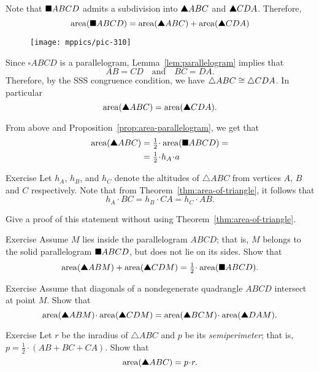 {Note that $\blacksquare ABCD$ admits a subdivision into $\solidtriangle ABC$ and $\solidtriangle CDA$.
Therefore, 
\[\area(\solidsquare ABCD)
=
\area(\solidtriangle ABC)
+
\area(\solidtriangle CDA)\]

\begin{wrapfigure}{o}{28 mm}
\centering
\texttt{[image: mppics/pic-310]}
\end{wrapfigure}

Since $\square ABCD$ is a parallelogram,  Lemma~\ref{lem:parallelogram} implies that
\[AB=CD
\quad
\text{and}
\quad
BC=DA.\]
Therefore, by the SSS congruence condition, we have
$\triangle ABC\z\cong\triangle CDA$.
In particular
\[\area(\solidtriangle ABC)
=
\area(\solidtriangle CDA).\]

From above and Proposition~\ref{prop:area-parallelogram}, we get that
\begin{align*}
\area(\solidtriangle ABC)
&=\tfrac12\cdot\area(\solidsquare ABCD)=
\\
&=\tfrac12\cdot h_A\cdot a
\end{align*}
\qedsf

\begin{thm}{Exercise}\label{ex:three-trig}
Let $h_A$, $h_B$, and $h_C$ denote the altitudes of $\triangle ABC$ from vertices $A$, $B$ and $C$ respectively.
Note that from Theorem~\ref{thm:area-of-triangle},
it follows that
\[h_A\cdot BC=h_B\cdot CA=h_C\cdot AB.\]

Give a proof of this statement without using Theorem~\ref{thm:area-of-triangle}.
\end{thm}

\begin{thm}{Exercise}\label{ex:half-parallelogram}
Assume $M$ lies inside the parallelogram $ABCD$;
that is, $M$ belongs to the solid parallelogram $\blacksquare ABCD$, but does not lie on its sides.
Show that
\[\area(\solidtriangle ABM)+\area(\solidtriangle CDM)
=\tfrac12\cdot \area(\solidsquare ABCD).\]
\end{thm}


\begin{thm}{Exercise}\label{ex:area-diag}
Assume that diagonals 
of a nondegenerate quadrangle $ABCD$ 
intersect at point $M$.
Show that 
\[\area(\solidtriangle ABM)\cdot\area(\solidtriangle CDM)
=
\area(\solidtriangle BCM)\cdot\area(\solidtriangle DAM).\]
 
\end{thm}

\begin{thm}{Exercise}\label{ex:area-inradius}
Let $r$ be the inradius of $\triangle ABC$
and $p$ be its {}\emph{semiperimeter}; 
that is, $p=\tfrac12\cdot(AB+BC+CA)$.
Show that
\[\area(\solidtriangle ABC)=p\cdot r.\]


\end{thm}}
